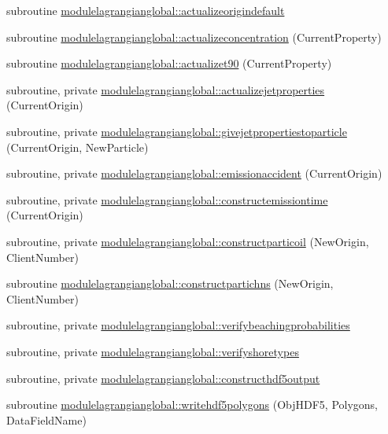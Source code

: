 \begin{DoxyCompactItemize}
\item 
subroutine \mbox{\hyperlink{namespacemodulelagrangianglobal_acd7b83696893d6d898a278da13db5768}{modulelagrangianglobal\+::actualizeorigindefault}}
\item 
subroutine \mbox{\hyperlink{namespacemodulelagrangianglobal_a9011e7719eb353ee72ecbd6bce3e7ac1}{modulelagrangianglobal\+::actualizeconcentration}} (Current\+Property)
\item 
subroutine \mbox{\hyperlink{namespacemodulelagrangianglobal_a56f5f58e1be0e429b3e792cfd510ddb0}{modulelagrangianglobal\+::actualizet90}} (Current\+Property)
\item 
subroutine, private \mbox{\hyperlink{namespacemodulelagrangianglobal_a26ef74f75ff18c16e01e326e85d7920c}{modulelagrangianglobal\+::actualizejetproperties}} (Current\+Origin)
\item 
subroutine, private \mbox{\hyperlink{namespacemodulelagrangianglobal_a24724892759ef0c6bdbe24cb1ecfd00b}{modulelagrangianglobal\+::givejetpropertiestoparticle}} (Current\+Origin, New\+Particle)
\item 
subroutine, private \mbox{\hyperlink{namespacemodulelagrangianglobal_a8a8675b6cb7d5395b650391ce4ac3fac}{modulelagrangianglobal\+::emissionaccident}} (Current\+Origin)
\item 
subroutine, private \mbox{\hyperlink{namespacemodulelagrangianglobal_a13d67d5bfe97a6d21e41748215a9fd5c}{modulelagrangianglobal\+::constructemissiontime}} (Current\+Origin)
\item 
subroutine, private \mbox{\hyperlink{namespacemodulelagrangianglobal_a070a6d8670eb489aaa0ce90aba70b1cc}{modulelagrangianglobal\+::constructparticoil}} (New\+Origin, Client\+Number)
\item 
subroutine \mbox{\hyperlink{namespacemodulelagrangianglobal_ab6e9439dc837db2093ed5e4108e57726}{modulelagrangianglobal\+::constructpartichns}} (New\+Origin, Client\+Number)
\item 
subroutine, private \mbox{\hyperlink{namespacemodulelagrangianglobal_aee31fff31d61d2bd1593396996588917}{modulelagrangianglobal\+::verifybeachingprobabilities}}
\item 
subroutine, private \mbox{\hyperlink{namespacemodulelagrangianglobal_a5abbe7b9c24cce4b55bf9e30a7bb418a}{modulelagrangianglobal\+::verifyshoretypes}}
\item 
subroutine, private \mbox{\hyperlink{namespacemodulelagrangianglobal_a72385af4d9a1a57607853866a0eb0fe0}{modulelagrangianglobal\+::constructhdf5output}}
\item 
subroutine \mbox{\hyperlink{namespacemodulelagrangianglobal_a123df5d7675f21137327cf36ed875f91}{modulelagrangianglobal\+::writehdf5polygons}} (Obj\+H\+D\+F5, Polygons, Data\+Field\+Name)

\end{DoxyCompactItemize}
